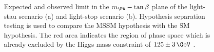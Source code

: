 \begin{figure}[tbh]
\caption[Expected and observed limit in the $m_{\PA}-\tan\beta$ plane of the
light-stau scenario (a) and light-stop scenario (b).]
{Expected and observed limit in the $m_{\PA}-\tan\beta$ plane of the
light-stau scenario (a) and light-stop scenario (b). Hypothesis
separation testing is used to compare the \ac{MSSM} hypothesis with the SM
hypothesis. The red area indicates the region of phase space which is already
excluded by the Higgs mass constraint of $125\pm3\,\GeV$ \cite{HIG-13-021}.}
\label{fig:lightstaulightstop}
\end{figure}

